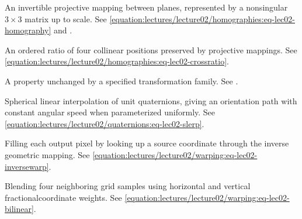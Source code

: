 \documentclass[letterpaper,11pt,english,openany,oneside]{jupyterBook}
\begin{document}
\begin{description}
\sphinxAtStartPar
An invertible projective mapping between planes, represented by a nonsingular \(3\times3\) matrix up to scale. See \eqref{equation:lectures/lecture02/homographies:eq-lec02-homography} and {\hyperref[\detokenize{lectures/lecture02/homographies:lec02-homographies}]{}}.

\sphinxAtStartPar
An ordered ratio of four collinear positions preserved by projective mappings. See \eqref{equation:lectures/lecture02/homographies:eq-lec02-crossratio}.

\sphinxAtStartPar
A property unchanged by a specified transformation family. See {\hyperref[\detokenize{lectures/lecture02/homographies:lec02-homographies}]{}}.

\sphinxAtStartPar
Spherical linear interpolation of unit quaternions, giving an orientation path with constant angular speed when parameterized uniformly. See \eqref{equation:lectures/lecture02/quaternions:eq-lec02-slerp}.

\sphinxAtStartPar
Filling each output pixel by looking up a source coordinate through the inverse geometric mapping. See \eqref{equation:lectures/lecture02/warping:eq-lec02-inversewarp}.

\sphinxAtStartPar
Blending four neighboring grid samples using horizontal and vertical fractional\sphinxhyphen{}coordinate weights. See \eqref{equation:lectures/lecture02/warping:eq-lec02-bilinear}.


\end{description}
\end{document}
